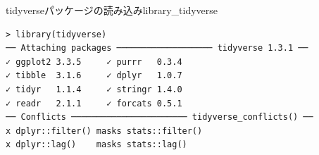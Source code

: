 \begin{Rscreen}{tidyverseパッケージの読み込み}{library_tidyverse}
	\begin{verbatim}
> library(tidyverse)
── Attaching packages ─────────────────── tidyverse 1.3.1 ──
✓ ggplot2 3.3.5     ✓ purrr   0.3.4
✓ tibble  3.1.6     ✓ dplyr   1.0.7
✓ tidyr   1.1.4     ✓ stringr 1.4.0
✓ readr   2.1.1     ✓ forcats 0.5.1
── Conflicts ─────────────────────── tidyverse_conflicts() ──
x dplyr::filter() masks stats::filter()
x dplyr::lag()    masks stats::lag()
\end{verbatim}
\end{Rscreen}
